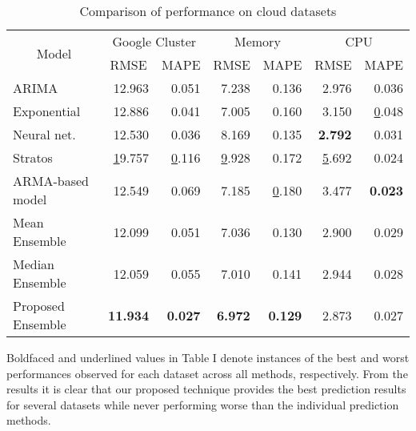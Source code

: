 \begin{table}[]
\label{prediction_cloud}
\centering
\caption{Comparison of performance on cloud datasets}
\begin{tabular}{|l|r|r|r|r|r|r|}
\hline
\multicolumn{1}{|c|}{\multirow{2}{*}{Model}} & \multicolumn{2}{c|}{Google Cluster}                   & \multicolumn{2}{c|}{Memory}                              & \multicolumn{2}{c|}{CPU}                              \\ \cline{2-7} 
\multicolumn{1}{|c|}{}                       & \multicolumn{1}{c|}{RMSE} & \multicolumn{1}{c|}{MAPE} & \multicolumn{1}{c|}{RMSE} & \multicolumn{1}{c|}{MAPE} & \multicolumn{1}{c|}{RMSE} & \multicolumn{1}{c|}{MAPE} \\ \hline
ARIMA                                        & 12.963                    & 0.051                     & 7.238                     & 0.136                     & 2.976                     & 0.036                     \\ \hline
Exponential                                  & 12.886                    & 0.041                     & 7.005                     & 0.160                     & 3.150                     & {\ul 0.048}               \\ \hline
Neural net.                                  & 12.530                    & 0.036                     & 8.169                     & 0.135                     & \textbf{2.792}            & 0.031                     \\ \hline
Stratos                                      & {\ul 19.757}              & {\ul 0.116}               & {\ul 9.928}               & 0.172               & {\ul 5.692}               & 0.024            \\ \hline

ARMA-based model                                      & 12.549              & 0.069               & 7.185               & {\ul 0.180}               & 3.477               & \textbf{0.023}            \\ \hline

Mean Ensemble                                      & 12.099              & 0.051               & 7.036               & 0.130               & 2.900               & 0.029            \\ \hline
Median Ensemble                                      &  12.059              & 0.055               &  7.010               & 0.141               & 2.944               & 0.028            \\ \hline

Proposed Ensemble                                     & \textbf{11.934}           & \textbf{0.027}            & \textbf{6.972}            & \textbf{0.129}            & 2.873                     & 0.027                     \\ \hline
\end{tabular}
\end{table}

Boldfaced and underlined values in Table I denote instances of the best and worst performances observed for each dataset across all methods, respectively. From the results it is clear that our proposed technique provides the best prediction results for several datasets while never performing worse than the individual prediction methods.